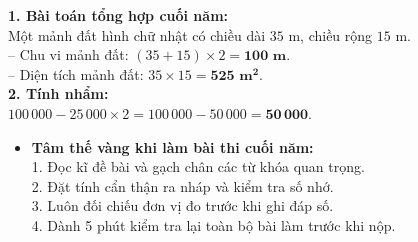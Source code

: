 \documentclass[11pt,a4paper]{article}
\begin{document}
\vspace{-2.5mm}
\noindent
\begin{minipage}[t]{0.49\textwidth}\vspace{0pt}
\begin{tcolorbox}[
  enhanced,
  colback=green!4!white,
  colframe=green!60!black,
  arc=2mm, boxrule=0.8pt,
  left=2mm, right=2mm, top=1.8mm, bottom=1.8mm,
  title={\footnotesize\bfseries\color{white}\faCheckCircle\ Ví dụ thực hành chuẩn mực}
]
{\footnotesize
\textbf{1. Bài toán tổng hợp cuối năm:}\\
Một mảnh đất hình chữ nhật có chiều dài $35\text{ m}$, chiều rộng $15\text{ m}$.\\
-- Chu vi mảnh đất: $(35 + 15) \times 2 = \mathbf{100\text{ m}}$.\\
-- Diện tích mảnh đất: $35 \times 15 = \mathbf{525\text{ m}^2}$.\\
\textbf{2. Tính nhẩm:}\\
$100\,000 - 25\,000 \times 2 = 100\,000 - 50\,000 = \mathbf{50\,000}$.
}
\end{tcolorbox}
\end{minipage}
\hfill
\begin{minipage}[t]{0.49\textwidth}\vspace{0pt}
\begin{tcolorbox}[
  enhanced,
  colback=red!4!white,
  colframe=red!70!black,
  arc=2mm, boxrule=0.8pt,
  left=2mm, right=2mm, top=1.8mm, bottom=1.8mm,
  title={\footnotesize\bfseries\color{white}\faExclamationTriangle\ Mẹo tránh bẫy trắc nghiệm}
]
{\footnotesize
\begin{itemize}\setlength{\itemsep}{1.5pt}\setlength{\leftskip}{-2.5mm}
  \item \textbf{Tâm thế vàng khi làm bài thi cuối năm:}\\
  1. Đọc kĩ đề bài và gạch chân các từ khóa quan trọng.\\
  2. Đặt tính cẩn thận ra nháp và kiểm tra số nhớ.\\
  3. Luôn đối chiếu đơn vị đo trước khi ghi đáp số.\\
  4. Dành 5 phút kiểm tra lại toàn bộ bài làm trước khi nộp.
\end{itemize}
}
\end{tcolorbox}
\end{minipage}
\end{document}
